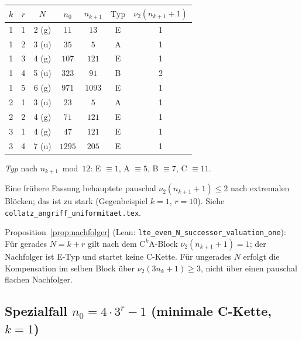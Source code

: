 \documentclass[12pt,a4paper]{article}
\newcommand{\vii}{\nu_2}
\begin{document}
\begin{center}
\renewcommand{\arraystretch}{1.3}
\begin{tabular}{ccccccc}
\toprule
$k$ & $r$ & $N$ & $n_0$ & $n_{k+1}$ & $\text{Typ}$ & $\vii(n_{k+1}+1)$ \\
\midrule
1 & 1 & 2 (g) & $11$   & $13$   & E & 1 \\
1 & 2 & 3 (u) & $35$   & $5$    & A & 1 \\
1 & 3 & 4 (g) & $107$  & $121$  & E & 1 \\
1 & 4 & 5 (u) & $323$  & $91$   & B & 2 \\
1 & 5 & 6 (g) & $971$  & $1093$ & E & 1 \\
2 & 1 & 3 (u) & $23$   & $5$    & A & 1 \\
2 & 2 & 4 (g) & $71$   & $121$  & E & 1 \\
3 & 1 & 4 (g) & $47$   & $121$  & E & 1 \\
3 & 4 & 7 (u) & $1295$ & $205$  & E & 1 \\
\bottomrule
\end{tabular}
\end{center}

\textit{Typ} nach $n_{k+1} \bmod 12$: E $\equiv 1$, A $\equiv 5$, B $\equiv 7$, C $\equiv 11$.

\begin{tcolorbox}[colback=red!8,colframe=red!60!black,title={Korrektur (Juni 2026)}]
Eine frühere Fassung behauptete pauschal $\vii(n_{k+1}+1)\leq 2$ nach
extremalen Blöcken; das ist zu stark (Gegenbeispiel $k{=}1$, $r{=}10$).
Siehe \texttt{collatz\_angriff\_uniformitaet.tex}.
\end{tcolorbox}

\begin{tcolorbox}[ergebnis, title={Strukturelle Kompensation (präzise)}]
Proposition~\ref{prop:nachfolger} (Lean: \texttt{lte\_even\_N\_successor\_valuation\_one}):
Für gerades $N=k+r$ gilt nach dem $\mathrm{C}^k\mathrm{A}$-Block
$\vii(n_{k+1}+1)=1$; der Nachfolger ist E-Typ und startet keine C-Kette.
Für ungerades $N$ erfolgt die Kompensation im selben Block über
$\vii(3n_k+1)\geq 3$, nicht über einen pauschal flachen Nachfolger.
\end{tcolorbox}

\subsection{Spezialfall $n_0 = 4\cdot 3^r - 1$ (minimale C-Kette, $k=1$)}
\end{document}
